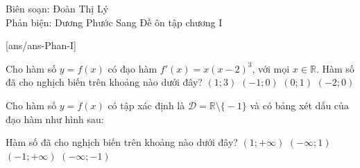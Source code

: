 ﻿\begin{name}
 {Biên soạn: Đoàn Thị Lý \\ Phản biện: Dương Phước Sang}
 {Đề ôn tập chương I}
\end{name}

\caulc
{}[ans/ans\currfilebase-Phan-I]
\begin{ex}%
 Cho hàm số $y=f(x)$ có đạo hàm $f'(x)=x(x-2)^3$, với mọi $x \in \mathbb{R}$. Hàm số đã cho nghịch biến trên khoảng nào dưới đây?
 \choice 
 {$(1;3)$}
 {$(-1;0)$}
 {\True $(0;1)$}
 {$(-2;0)$}
\end{ex}

\begin{ex}%
 Cho hàm số $y=f(x)$ có tập xác định là $\mathscr{D}=\mathbb{R}\setminus\big\{-1\big\}$ và có bảng xét dấu của đạo hàm như hình sau:
 \begin{center}
 \end{center}
 Hàm số đã cho nghịch biến trên khoảng nào dưới đây? 
 \choice 
 {$(1 ;+\infty)$}
 {$(-\infty; 1)$}
 {$(-1;+\infty)$}
 {\True $(-\infty;-1)$}
\end{ex}

